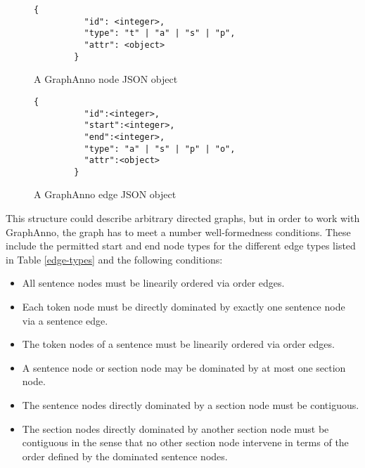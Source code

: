 \documentclass[12pt]{scrartcl}
\newenvironment{figurel}{\begin{figure}[htb]}{\end{figure}}
\begin{document}
\begin{figurel}
	\begin{lstlisting}[gobble=8]
		{
		  "id": <integer>,
		  "type": "t" | "a" | "s" | "p",
		  "attr": <object>
		}
	\end{lstlisting}
	\caption{A GraphAnno node JSON object}
	\label{json-node}
\end{figurel}
\begin{figurel}
	\begin{lstlisting}[gobble=8]
		{
		  "id":<integer>,
		  "start":<integer>,
		  "end":<integer>,
		  "type": "a" | "s" | "p" | "o",
		  "attr":<object>
		}
	\end{lstlisting}
	\caption{A GraphAnno edge JSON object}
	\label{json-edge}
\end{figurel}

This structure could describe arbitrary directed graphs, but in order to work with GraphAnno, the graph has to meet a number well-formedness conditions. These include the permitted start and end node types for the different edge types listed in Table \ref{edge-types} and the following conditions:

\begin{itemize}
	\item All sentence nodes must be linearily ordered via order edges.
	\item Each token node must be directly dominated by exactly one sentence node via a sentence edge.
	\item The token nodes of a sentence must be linearily ordered via order edges.
	\item A sentence node or section node may be dominated by at most one section node.
	\item The sentence nodes directly dominated by a section node must be contiguous.
	\item The section nodes directly dominated by another section node must be contiguous in the sense that no other section node intervene in terms of the order defined by the dominated sentence nodes.
\end{itemize}
\end{document}

